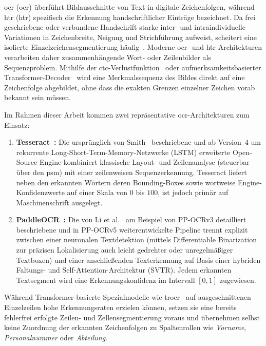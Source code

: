 \acl{ocr} (\ac{ocr}) überführt Bildausschnitte von Text in digitale Zeichenfolgen, während \acl{htr} (\ac{htr}) spezifisch die Erkennung handschriftlicher Einträge bezeichnet. Da frei geschriebene oder verbundene Handschrift starke inter- und intraindividuelle Variationen in Zeichenbreite, Neigung und Strichführung aufweist, scheitert eine isolierte Einzelzeichensegmentierung häufig~\cite{Ploetz2009MarkovSurvey}. Moderne \ac{ocr}- und \ac{htr}-Architekturen verarbeiten daher zusammenhängende Wort- oder Zeilenbilder als Sequenzproblem. Mithilfe der \ac{ctc}-Verlustfunktion~\cite{Graves2006CTC} oder aufmerksamkeitsbasierter Transformer-Decoder~\cite{Li2023TrOCR} wird eine Merkmalssequenz des Bildes direkt auf eine Zeichenfolge abgebildet, ohne dass die exakten Grenzen einzelner Zeichen vorab bekannt sein müssen.

Im Rahmen dieser Arbeit kommen zwei repräsentative \ac{ocr}-Architekturen zum Einsatz:
\begin{enumerate}
  \item \textbf{Tesseract~\cite{Smith2007Tesseract}:} Die ursprünglich von Smith~\cite{Smith2007Tesseract} beschriebene und ab Version~4 um rekurrente Long-Short-Term-Memory-Netzwerke (LSTM) erweiterte Open-Source-Engine kombiniert klassische Layout- und Zeilenanalyse (steuerbar über den \ac{psm}) mit einer zeilenweisen Sequenzerkennung. Tesseract liefert neben den erkannten Wörtern deren Bounding-Boxes sowie wortweise Engine-Konfidenzwerte auf einer Skala von $0$ bis $100$, ist jedoch primär auf Maschinenschrift ausgelegt.
  \item \textbf{PaddleOCR~\cite{Li2022PPOCRv3}:} Die von Li et al.~\cite{Li2022PPOCRv3} am Beispiel von PP-OCRv3 detailliert beschriebene und in PP-OCRv5 weiterentwickelte Pipeline trennt explizit zwischen einer neuronalen Textdetektion (mittels Differentiable Binarization zur präzisen Lokalisierung auch leicht gedrehter oder unregelmäßiger Textboxen) und einer anschließenden Texterkennung auf Basis einer hybriden Faltungs- und Self-Attention-Architektur (SVTR). Jedem erkannten Textsegment wird eine Erkennungskonfidenz im Intervall $[0, 1]$ zugewiesen.
\end{enumerate}

Während Transformer-basierte Spezialmodelle wie \ac{trocr}~\cite{Li2023TrOCR} auf ausgeschnittenen Einzelzeilen hohe Erkennungsraten erzielen können, setzen sie eine bereits fehlerfrei erfolgte Zeilen- und Zellensegmentierung voraus und übernehmen selbst keine Zuordnung der erkannten Zeichenfolgen zu Spaltenrollen wie \emph{Vorname}, \emph{Personalnummer} oder \emph{Abteilung}.


